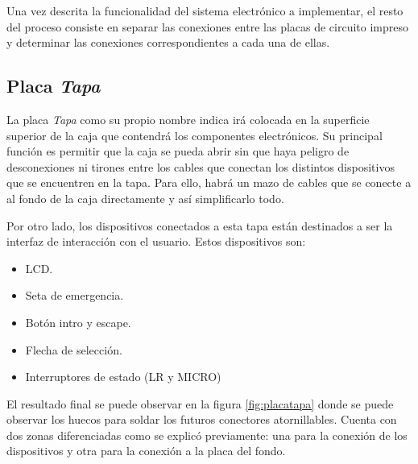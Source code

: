 Una vez descrita la funcionalidad del sistema electrónico a implementar, el resto del proceso consiste en 
separar las conexiones entre las placas de circuito impreso y determinar las conexiones correspondientes a 
cada una de ellas.

\subsection{Placa \textit{Tapa}}

La placa \textit{Tapa} como su propio nombre indica irá colocada en la superficie superior de la caja que contendrá los componentes electrónicos. Su principal función es permitir que la caja se pueda abrir sin que haya peligro de desconexiones ni tirones entre los cables que conectan los distintos dispositivos que se encuentren en la tapa. Para ello, habrá un mazo de cables que se conecte a al fondo de la caja directamente y así simplificarlo todo.

Por otro lado, los dispositivos conectados a esta tapa están destinados a ser la interfaz 
de interacción con el usuario. Estos dispositivos son:
\begin{itemize}
    \item LCD.
    \item Seta de emergencia.
    \item Botón intro y escape.
    \item Flecha de selección.
    \item Interruptores de estado (LR y MICRO)
\end{itemize}

El resultado final se puede observar en la figura \ref{fig:placatapa} donde se puede observar los 
huecos para soldar los futuros conectores atornillables. Cuenta con dos zonas diferenciadas como se 
explicó previamente: una para la conexión de los dispositivos y otra para la conexión a la placa del 
fondo.

